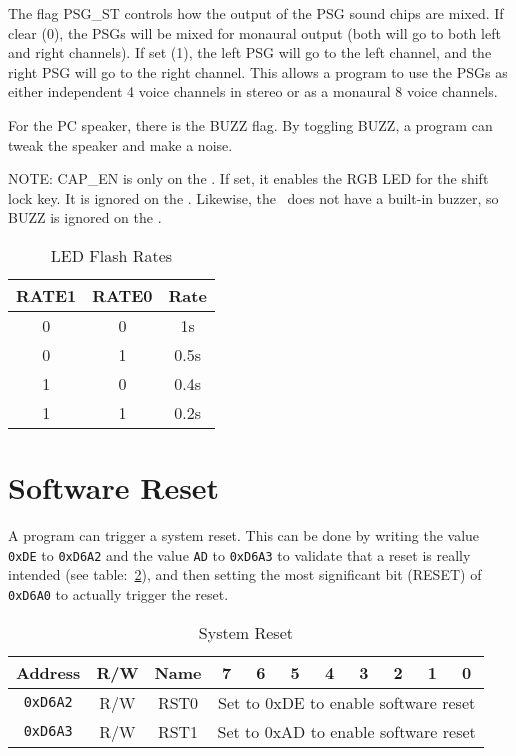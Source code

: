 The flag PSG\_ST controls how the output of the PSG sound chips are mixed. If clear (0), the PSGs will be mixed for monaural output (both will go to both left and right channels). If set (1), the left PSG will go to the left channel, and the right PSG will go to the right channel. This allows a program to use the PSGs as either independent 4 voice channels in stereo or as a monaural 8 voice channels.

For the PC speaker, there is the BUZZ flag. By toggling BUZZ, a program can tweak the speaker and make a noise.

\begin{leftbar}
    NOTE: CAP\_EN is only on the \fk. If set, it enables the RGB LED for the shift lock key. It is ignored on the \jr.
    Likewise, the \fk\ does not have a built-in buzzer, so BUZZ is ignored on the \fk.    
\end{leftbar}

\begin{table}[ht]
    \begin{center}
        \begin{tabular}{|c|c|c|} \hline
            RATE1 & RATE0 & Rate \\\hline\hline
            0 & 0 & 1s \\ \hline
            0 & 1 & 0.5s \\ \hline
            1 & 0 & 0.4s \\ \hline
            1 & 1 & 0.2s \\ \hline
        \end{tabular}
    \end{center}
    \caption{LED Flash Rates}
    \label{tab:led_rates}
\end{table}

\section*{Software Reset}

A program can trigger a system reset. This can be done by writing the value \verb+0xDE+ to \verb+0xD6A2+ and the value \verb+AD+ to \verb+0xD6A3+ to validate that a reset is really intended (see table:~\ref{tab:sys_reset}), and then setting the most significant bit (RESET) of \verb+0xD6A0+ to actually trigger the reset.

\begin{table}[ht]
    \begin{center}
        \begin{tabular}{|c|c|c|c|c|c|c|c|c|c|c|} \hline
            Address & R/W & Name & 7 & 6 & 5 & 4 & 3 & 2 & 1 & 0 \\\hline\hline
            \verb+0xD6A2+ & R/W & RST0 & \multicolumn{8}{|c|}{Set to 0xDE to enable software reset} \\ \hline
            \verb+0xD6A3+ & R/W & RST1 & \multicolumn{8}{|c|}{Set to 0xAD to enable software reset} \\ \hline
        \end{tabular}
    \end{center}
    \caption{System Reset}
    \label{tab:sys_reset}
\end{table}

